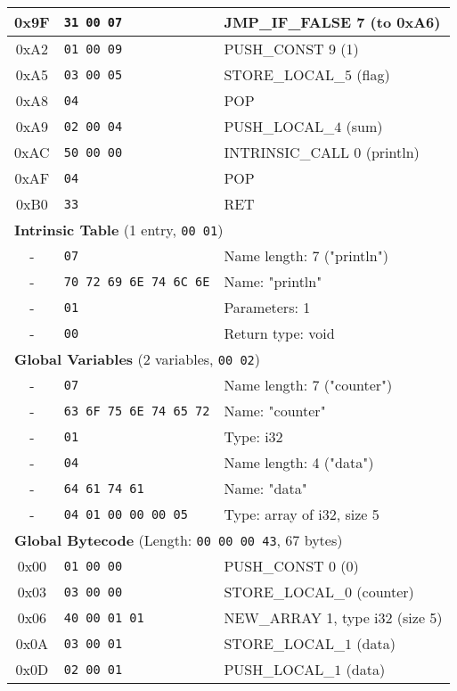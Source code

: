 \documentclass[a4paper,12pt]{article}
\begin{document}
\begin{longtable}{|c|l|p{6cm}|}
  0x9F & \texttt{31 00 07} & JMP\_IF\_FALSE 7 (to 0xA6) \\ \hline
  0xA2 & \texttt{01 00 09} & PUSH\_CONST 9 (1) \\ \hline
  0xA5 & \texttt{03 00 05} & STORE\_LOCAL\_$5$ (flag) \\ \hline
  0xA8 & \texttt{04} & POP \\ \hline
  0xA9 & \texttt{02 00 04} & PUSH\_LOCAL\_$4$ (sum) \\ \hline
  0xAC & \texttt{50 00 00} & INTRINSIC\_CALL 0 (println) \\ \hline
  0xAF & \texttt{04} & POP \\ \hline
  0xB0 & \texttt{33} & RET \\ \hline
\multicolumn{3}{|l|}{\textbf{Intrinsic Table} (1 entry, \texttt{00 01})} \\ \hline
  - & \texttt{07} & Name length: 7 ("println") \\ \hline
  - & \texttt{70 72 69 6E 74 6C 6E} & Name: "println" \\ \hline
  - & \texttt{01} & Parameters: 1 \\ \hline
  - & \texttt{00} & Return type: void \\ \hline
\multicolumn{3}{|l|}{\textbf{Global Variables} (2 variables, \texttt{00 02})} \\ \hline
  - & \texttt{07} & Name length: 7 ("counter") \\ \hline
  - & \texttt{63 6F 75 6E 74 65 72} & Name: "counter" \\ \hline
  - & \texttt{01} & Type: i32 \\ \hline
  - & \texttt{04} & Name length: 4 ("data") \\ \hline
  - & \texttt{64 61 74 61} & Name: "data" \\ \hline
  - & \texttt{04 01 00 00 00 05} & Type: array of i32, size 5 \\ \hline
\multicolumn{3}{|l|}{\textbf{Global Bytecode} (Length: \texttt{00 00 00 43}, 67 bytes)} \\ \hline
  0x00 & \texttt{01 00 00} & PUSH\_CONST 0 (0) \\ \hline
  0x03 & \texttt{03 00 00} & STORE\_LOCAL\_$0$ (counter) \\ \hline
  0x06 & \texttt{40 00 01 01} & NEW\_ARRAY 1, type i32 (size 5) \\ \hline
  0x0A & \texttt{03 00 01} & STORE\_LOCAL\_$1$ (data) \\ \hline
  0x0D & \texttt{02 00 01} & PUSH\_LOCAL\_$1$ (data) \\ \hline

\end{longtable}
\end{document}
